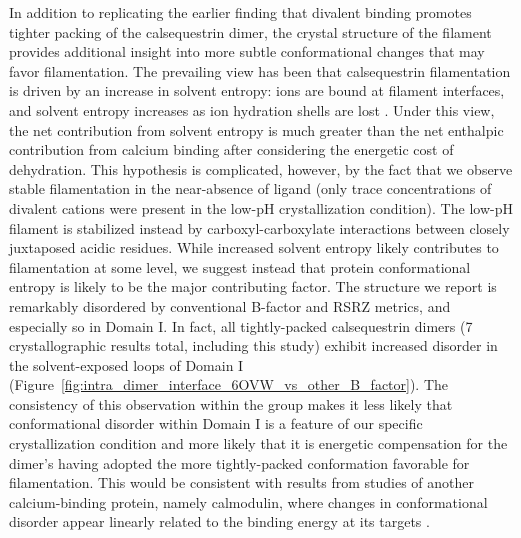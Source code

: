 In addition to replicating the earlier finding that divalent binding promotes tighter packing of the calsequestrin dimer, the crystal structure of the filament provides additional insight into more subtle conformational changes that may favor filamentation. The prevailing view has been that calsequestrin filamentation is driven by an increase in solvent entropy: ions are bound at filament interfaces, and solvent entropy increases as ion hydration shells are lost \cite{Krause1991-le}. Under this view, the net contribution from solvent entropy is much greater than the net enthalpic contribution from calcium binding after considering the energetic cost of dehydration. This hypothesis is complicated, however, by the fact that we observe stable filamentation in the near-absence of ligand (only trace concentrations of divalent cations were present in the low-pH crystallization condition). The low-pH filament is stabilized instead by carboxyl-carboxylate interactions between closely juxtaposed acidic residues. While increased solvent entropy likely contributes to filamentation at some level, we suggest instead that protein conformational entropy is likely to be the major contributing factor. The structure we report is remarkably disordered by conventional B-factor and RSRZ metrics, and especially so in Domain I. In fact, all tightly-packed calsequestrin dimers (7 crystallographic results total, including this study) exhibit increased disorder in the solvent-exposed loops of Domain I (Figure~\ref{fig:intra_dimer_interface_6OVW_vs_other_B_factor}). The consistency of this observation within the group makes it less likely that conformational disorder within Domain I is a feature of our specific crystallization condition and more likely that it is energetic compensation for the dimer's having adopted the more tightly-packed conformation favorable for filamentation. This would be consistent with results from studies of another calcium-binding protein, namely calmodulin, where changes in conformational disorder appear linearly related to the binding energy at its targets \cite{Frederick2007-in}. %

